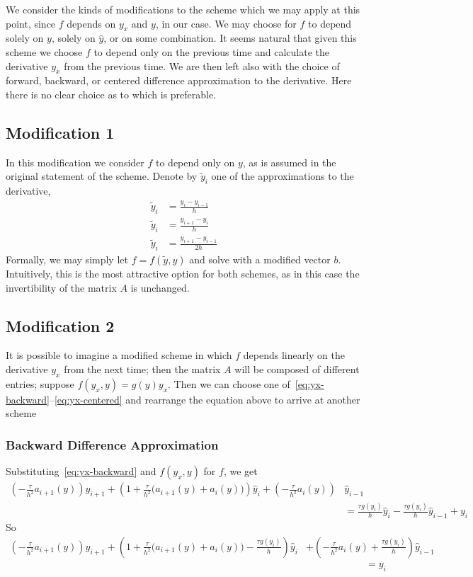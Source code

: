 \documentclass[12pt, reqno]{amsart}
\begin{document}
We consider the kinds of modifications to the scheme which we may apply at this point, since $f$ depends on $y_{x}$ and $y$, in our case.
We may choose for $f$ to depend solely on $y$, solely on $\hat{y}$, or on some combination.
It seems natural that given this scheme we choose $f$ to depend only on the previous time and calculate the derivative $y_{x}$ from the previous time.
We are then left also with the choice of forward, backward, or centered difference approximation to the derivative.
Here there is no clear choice as to which is preferable.

\subsection{Modification 1}
In this modification we consider $f$ to depend only on $y$, as is assumed in the original statement of the scheme.
Denote by $\tilde{y}_{i}$ one of the approximations to the derivative,
\begin{align}
  \tilde{y}_{i} & =\frac{y_{i}-y_{i-1}}{h}\label{eq:yx-backward}    \\
  \tilde{y}_{i} & =\frac{y_{i+1}-y_{i}}{h}\label{eq:yx-forward}     \\
  \tilde{y}_{i} & =\frac{y_{i+1}-y_{i-1}}{2h}\label{eq:yx-centered}
\end{align}
Formally, we may simply let $f=f(\tilde{y},y)$ and solve with a modified vector $b$.
Intuitively, this is the most attractive option for both schemes, as in this case the invertibility of the matrix $A$ is unchanged.
\subsection{Modification 2}
It is possible to imagine a modified scheme in which $f$ depends linearly on the derivative $y_{x}$ from the next time; then the matrix $A$ will be composed of different entries; suppose $f(y_{x},y)=g(y)y_{x}$.
Then we can choose one of~\eqref{eq:yx-backward}--\eqref{eq:yx-centered} and rearrange the equation above to arrive at another scheme
\subsubsection{Backward Difference Approximation}
Substituting~\eqref{eq:yx-backward} and $f(y_{x},y)$ for $f$, we get
\begin{align*}
  \left(- \frac{\tau}{h^{2}}a_{i+1}(y)\right)\hat{y}_{i+1}+\left(1+\frac{\tau}{h^{2}}\big(a_{i+1}(y)+ a_{i}(y)\big)\right)\hat{y}_{i}+\left(- \frac{\tau}{h^{2}}a_{i}(y)\right)
   & \hat{y}_{i-1}
  \\
   & = \frac{\tau g(y_{i})}{h}\hat{y}_{i}-\frac{\tau g(y_{i})}{h}\hat{y}_{i-1} +y_{i}
\end{align*}
So
\begin{align*}
  \left(- \frac{\tau}{h^{2}}a_{i+1}(y)\right)\hat{y}_{i+1}+\left(1+\frac{\tau}{h^{2}}\big(a_{i+1}(y)+ a_{i}(y)\big)-\frac{\tau g(y_{i})}{h}\right)\hat{y}_{i}
   & +\left(- \frac{\tau}{h^{2}}a_{i}(y)+\frac{\tau g(y_{i})}{h}\right)\hat{y}_{i-1}
  \\
   & \qquad\qquad\qquad = y_{i}
\end{align*}
\end{document}
